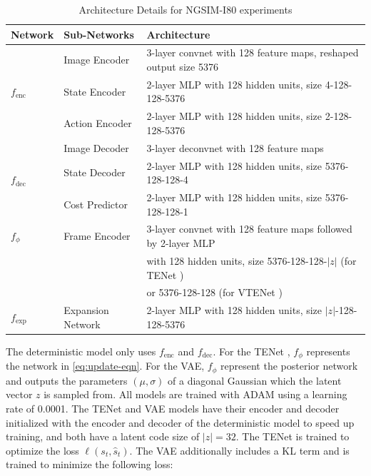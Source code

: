 \documentclass{article}
\newcommand{\modelname}{TENet }
\begin{document}
\begin{appendices}
\begin{table}[h]
  \caption{Architecture Details for NGSIM-I80 experiments}
  \label{sample-table}
  \centering
  \begin{tabular}{lll}
    \toprule
    Network & Sub-Networks     & Architecture    \\
    \midrule
    \multirow{3}{*}{$f_\text{enc}$} & Image Encoder & 3-layer convnet with 128 feature maps, reshaped output size 5376 \\
    & State Encoder & 2-layer MLP with 128 hidden units, size 4-128-128-5376 \\
    & Action Encoder & 2-layer MLP with 128 hidden units, size 2-128-128-5376  \\
    \hline
        \multirow{3}{*}{$f_\text{dec}$} & Image Decoder & 3-layer deconvnet with 128 feature maps \\
    & State Decoder & 2-layer MLP with 128 hidden units, size 5376-128-128-4 \\
        & Cost Predictor & 2-layer MLP with 128 hidden units, size 5376-128-128-1 \\
    \hline
    $f_\phi$ & Frame Encoder & 3-layer convnet with 128 feature maps followed by 2-layer MLP \\ & & with 128 hidden units, size 5376-128-128-$|z|$ (for \modelname) \\
    &               & or 5376-128-128 (for V\modelname) \\
    \hline
    $f_\text{exp}$ & Expansion Network & 2-layer MLP with 128 hidden units, size $|z|$-128-128-5376\\
    \hline
    \bottomrule
  \end{tabular}
\end{table}

The deterministic model only uses $f_\text{enc}$ and $f_\text{dec}$.
For the \modelname, $f_\phi$ represents the network in \cref{eq:update-eqn}.
For the VAE, $f_\phi$ represent the posterior network and outputs the parameters $(\mu, \sigma)$ of a diagonal Gaussian which the latent vector $z$ is sampled from.
All models are trained with ADAM \citep{ADAM} using a learning rate of 0.0001.
The \modelname and VAE models have their encoder and decoder initialized with the encoder and decoder of the deterministic model to speed up training, and both have a latent code size of $|z|=32$.
The \modelname is trained to optimize the loss $\ell(s_t, \hat{s}_t)$.
The VAE additionally includes a KL term and is trained to minimize the following loss:


\end{appendices}
\end{document}
